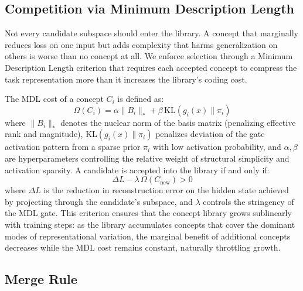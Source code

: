 \documentclass[11pt]{article}
\begin{document}
\subsection{Competition via Minimum Description Length}

Not every candidate subspace should enter the library. A concept that marginally reduces loss on one input but adds complexity that harms generalization on others is worse than no concept at all. We enforce selection through a Minimum Description Length criterion \cite{rissanen1978mdl,grunwald2007mdl} that requires each accepted concept to compress the task representation more than it increases the library's coding cost.

The MDL cost of a concept $C_i$ is defined as:
\begin{equation}
\Omega(C_i) = \alpha \|B_i\|_* + \beta\, \text{KL}(g_i(x) \| \pi_i)
\label{eq:mdl}
\end{equation}
where $\|B_i\|_*$ denotes the nuclear norm of the basis matrix (penalizing effective rank and magnitude), $\text{KL}(g_i(x) \| \pi_i)$ penalizes deviation of the gate activation pattern from a sparse prior $\pi_i$ with low activation probability, and $\alpha, \beta$ are hyperparameters controlling the relative weight of structural simplicity and activation sparsity. A candidate is accepted into the library if and only if:
\begin{equation}
\Delta L - \lambda\, \Omega(C_{\text{new}}) > 0
\label{eq:accept}
\end{equation}
where $\Delta L$ is the reduction in reconstruction error on the hidden state achieved by projecting through the candidate's subspace, and $\lambda$ controls the stringency of the MDL gate. This criterion ensures that the concept library grows sublinearly with training steps: as the library accumulates concepts that cover the dominant modes of representational variation, the marginal benefit of additional concepts decreases while the MDL cost remains constant, naturally throttling growth.

\subsection{Merge Rule}
\end{document}
